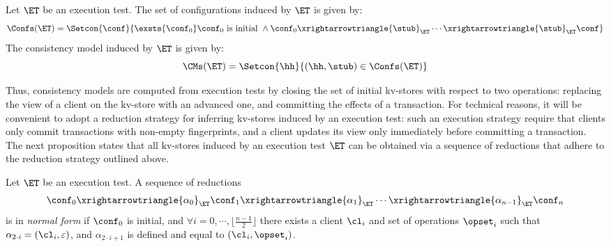 \begin{definition}
\label{def:cm}
Let $\ET$ be an execution test.
The set of configurations induced by $\ET$ is given by:
\[
\Confs(\ET) = \Setcon{ \conf}{ \exsts{\conf_0} \conf_0 \text{ is initial } \wedge \conf_0 \xrightarrowtriangle{\stub}_{\ET} \cdots \xrightarrowtriangle{\stub}_{\ET} \conf }
\]
The consistency model induced by $\ET$ is given by:
\[ 
\CMs(\ET) = \Setcon{ \hh }{ (\hh, \stub) \in \Confs(\ET) }
\]
%
\end{definition}
Thus, consistency models are computed from execution tests by closing the set of initial kv-stores with 
respect to two operations: replacing the view of a client on the kv-store with an advanced one, and committing 
the effects of a transaction. 
For technical reasons, it will be convenient to adopt a reduction strategy for inferring kv-stores induced by an 
execution test: such an execution strategy require that clients only commit transactions with non-empty fingerprints, 
and a client updates its view only immediately before committing a transaction. 
The next proposition states that all kv-stores induced by an execution test $\ET$ can be 
obtained via a sequence of reductions that adhere to the reduction strategy outlined above. 
\begin{definition}
Let $\ET$ be an execution test. A sequence of reductions 
\[
\conf_0 \xrightarrowtriangle{\alpha_0}_{\ET} \conf_1 \xrightarrowtriangle{\alpha_1}_{\ET} \cdots \xrightarrowtriangle{\alpha_{n-1}}_{\ET} \conf_{n}
\]
is in \emph{normal form} if $\conf_0$ is initial, and 
$\forall i=0,\cdots, \lfloor\frac{n-1}{2} \rfloor$ there exists a client $\cl_i$ and set of operations $\opset_{i}$ such that 
$\alpha_{2 \cdot i} = (\cl_{i}, \varepsilon)$, and $\alpha_{2 \cdot i + 1}$ is defined and equal to $(\cl_{i}, \opset_{i})$.
\end{definition}


